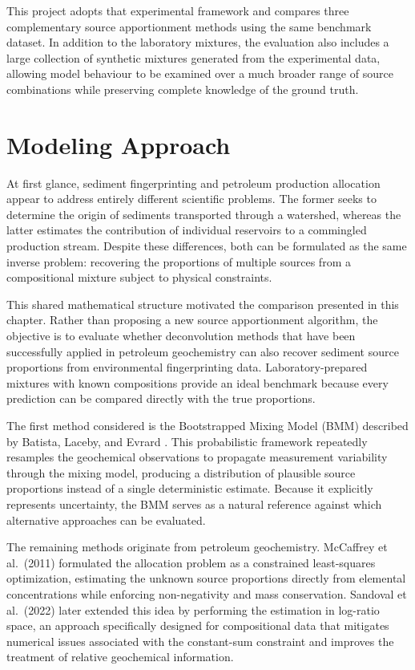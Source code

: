 \documentclass[
  12pt,
  letterpaper,
]{book}
\begin{document}
This project adopts that experimental framework and compares three
complementary source apportionment methods using the same benchmark
dataset. In addition to the laboratory mixtures, the evaluation also
includes a large collection of synthetic mixtures generated from the
experimental data, allowing model behaviour to be examined over a much
broader range of source combinations while preserving complete knowledge
of the ground truth.

\section{Modeling Approach}\label{modeling-approach-10}

At first glance, sediment fingerprinting and petroleum production
allocation appear to address entirely different scientific problems. The
former seeks to determine the origin of sediments transported through a
watershed, whereas the latter estimates the contribution of individual
reservoirs to a commingled production stream. Despite these differences,
both can be formulated as the same inverse problem: recovering the
proportions of multiple sources from a compositional mixture subject to
physical constraints.

This shared mathematical structure motivated the comparison presented in
this chapter. Rather than proposing a new source apportionment
algorithm, the objective is to evaluate whether deconvolution methods
that have been successfully applied in petroleum geochemistry can also
recover sediment source proportions from environmental fingerprinting
data. Laboratory-prepared mixtures with known compositions provide an
ideal benchmark because every prediction can be compared directly with
the true proportions.

The first method considered is the Bootstrapped Mixing Model (BMM)
described by Batista, Laceby, and Evrard
. This probabilistic
framework repeatedly resamples the geochemical observations to propagate
measurement variability through the mixing model, producing a
distribution of plausible source proportions instead of a single
deterministic estimate. Because it explicitly represents uncertainty,
the BMM serves as a natural reference against which alternative
approaches can be evaluated.

The remaining methods originate from petroleum geochemistry. McCaffrey
et al.~(2011) 
formulated the allocation problem as a constrained least-squares
optimization, estimating the unknown source proportions directly from
elemental concentrations while enforcing non-negativity and mass
conservation. Sandoval et al.~(2022)
 later extended this idea
by performing the estimation in log-ratio space, an approach
specifically designed for compositional data that mitigates numerical
issues associated with the constant-sum constraint and improves the
treatment of relative geochemical information.
\end{document}
